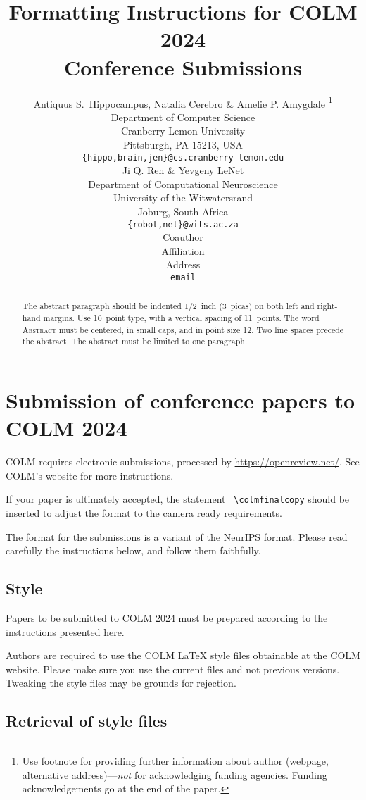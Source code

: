 \documentclass{article} %
\title{Formatting Instructions for COLM 2024 \\ Conference Submissions}
\author{Antiquus S.~Hippocampus, Natalia Cerebro \& Amelie P. Amygdale \thanks{ Use footnote for providing further information
about author (webpage, alternative address)---\emph{not} for acknowledging
funding agencies.  Funding acknowledgements go at the end of the paper.} \\
Department of Computer Science\\
Cranberry-Lemon University\\
Pittsburgh, PA 15213, USA \\
\texttt{\{hippo,brain,jen\}@cs.cranberry-lemon.edu} \\
\And
Ji Q. Ren \& Yevgeny LeNet \\
Department of Computational Neuroscience \\
University of the Witwatersrand \\
Joburg, South Africa \\
\texttt{\{robot,net\}@wits.ac.za} \\
\AND
Coauthor \\
Affiliation \\
Address \\
\texttt{email}
}
\begin{document}
\maketitle

\begin{abstract}
The abstract paragraph should be indented 1/2~inch (3~picas) on both left and
right-hand margins. Use 10~point type, with a vertical spacing of 11~points.
The word \textsc{Abstract} must be centered, in small caps, and in point size 12. Two
line spaces precede the abstract. The abstract must be limited to one
paragraph.
\end{abstract}

\section{Submission of conference papers to COLM 2024}

COLM requires electronic submissions, processed by
\url{https://openreview.net/}. See COLM's website for more instructions.

If your paper is ultimately accepted, the statement {\tt
  {\textbackslash}colmfinalcopy} should be inserted to adjust the
format to the camera ready requirements.

The format for the submissions is a variant of the NeurIPS format.
Please read carefully the instructions below, and follow them
faithfully.

\subsection{Style}

Papers to be submitted to COLM 2024 must be prepared according to the
instructions presented here.


Authors are required to use the COLM \LaTeX{} style files obtainable at the
COLM website. Please make sure you use the current files and
not previous versions. Tweaking the style files may be grounds for rejection.

\subsection{Retrieval of style files}
\end{document}
